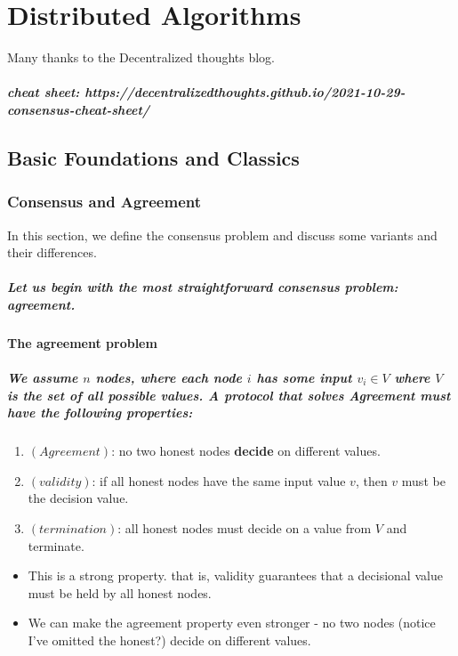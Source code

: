 \chapter{Distributed Algorithms}

Many thanks to the Decentralized thoughts blog.

\paragraph{cheat sheet: https://decentralizedthoughts.github.io/2021-10-29-consensus-cheat-sheet/}

\section{Basic Foundations and Classics}

\subsection{Consensus and Agreement}

In this section, we define the consensus problem and discuss some
variants and their differences.

\paragraph{Let us begin with the most straightforward consensus problem: agreement.}

\subsubsection{The agreement problem}

\paragraph{We assume $n$ nodes, where each node $i$ has some input $v_{i}\in V$
where $V$ is the set of all possible values. A protocol that solves Agreement must have the following properties:}
\begin{enumerate}
\item $\left(Agreement\right)$: no two honest nodes \textbf{decide} on
different values.
\item $\left(validity\right)$: if all honest nodes have the same input
value $v$, then $v$ must be the decision value.
\item $\left(termination\right)$: all honest nodes must decide on a value
from $V$ and terminate.
\end{enumerate}
\begin{itemize}
\item This is a strong property. that is, validity guarantees that a decisional
value must be held by all honest nodes.
\item We can make the agreement property even stronger - no two nodes (notice
I've omitted the honest?) decide on different values.
\end{itemize}
%

